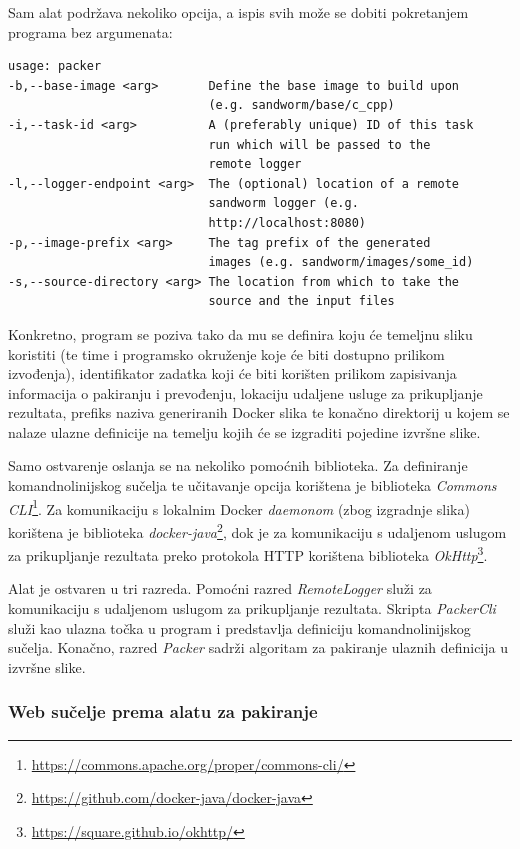 \documentclass[times, utf8, zavrsni]{fer}
\begin{document}
{Sam alat podržava nekoliko opcija, a ispis svih može se dobiti pokretanjem programa bez argumenata:

\begin{lstlisting}
usage: packer
-b,--base-image <arg>       Define the base image to build upon
                            (e.g. sandworm/base/c_cpp)
-i,--task-id <arg>          A (preferably unique) ID of this task
                            run which will be passed to the
                            remote logger
-l,--logger-endpoint <arg>  The (optional) location of a remote
                            sandworm logger (e.g.
                            http://localhost:8080)
-p,--image-prefix <arg>     The tag prefix of the generated
                            images (e.g. sandworm/images/some_id)
-s,--source-directory <arg> The location from which to take the
                            source and the input files
\end{lstlisting}

Konkretno, program se poziva tako da mu se definira koju će temeljnu sliku koristiti (te time i programsko okruženje koje će biti dostupno prilikom izvođenja), identifikator zadatka koji će biti korišten prilikom zapisivanja informacija o pakiranju i prevođenju, lokaciju udaljene usluge za prikupljanje rezultata, prefiks naziva generiranih Docker slika te konačno direktorij u kojem se nalaze ulazne definicije na temelju kojih će se izgraditi pojedine izvršne slike. 

Samo ostvarenje oslanja se na nekoliko pomoćnih biblioteka. Za definiranje komandnolinijskog sučelja te učitavanje opcija korištena je biblioteka {\textit{Commons CLI}}{\footnote{\url{https://commons.apache.org/proper/commons-cli/}}}. Za komunikaciju s lokalnim Docker {\textit{daemonom}} (zbog izgradnje slika) korištena je biblioteka {\textit{docker-java}}{\footnote{\url{https://github.com/docker-java/docker-java}}}, dok je za komunikaciju s udaljenom uslugom za prikupljanje rezultata preko protokola HTTP korištena biblioteka {\textit{OkHttp}}{\footnote{\url{https://square.github.io/okhttp/}}}.

Alat je ostvaren u tri razreda. Pomoćni razred {\textit{RemoteLogger}} služi za komunikaciju s udaljenom uslugom za prikupljanje rezultata. Skripta {\textit{PackerCli}} služi kao ulazna točka u program i predstavlja definiciju komandnolinijskog sučelja. Konačno, razred {\textit{Packer}} sadrži algoritam za pakiranje ulaznih definicija u izvršne slike.

\subsubsection{Web sučelje prema alatu za pakiranje}

}
\end{document}
